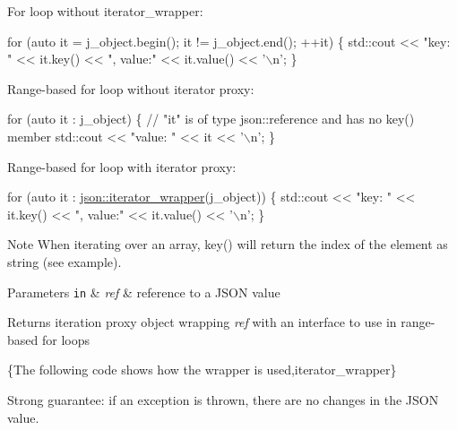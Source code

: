 For loop without iterator\+\_\+wrapper\+:


\begin{DoxyCode}
\textcolor{keywordflow}{for} (\textcolor{keyword}{auto} it = j\_object.begin(); it != j\_object.end(); ++it)
\{
    std::cout << \textcolor{stringliteral}{"key: "} << it.key() << \textcolor{stringliteral}{", value:"} << it.value() << \textcolor{charliteral}{'\(\backslash\)n'};
\}
\end{DoxyCode}


Range-\/based for loop without iterator proxy\+:


\begin{DoxyCode}
\textcolor{keywordflow}{for} (\textcolor{keyword}{auto} it : j\_object)
\{
    \textcolor{comment}{// "it" is of type json::reference and has no key() member}
    std::cout << \textcolor{stringliteral}{"value: "} << it << \textcolor{charliteral}{'\(\backslash\)n'};
\}
\end{DoxyCode}


Range-\/based for loop with iterator proxy\+:


\begin{DoxyCode}
\textcolor{keywordflow}{for} (\textcolor{keyword}{auto} it : \hyperlink{classnlohmann_1_1basic__json_a5e4212986136ca1220f351c60e89906b}{json::iterator\_wrapper}(j\_object))
\{
    std::cout << \textcolor{stringliteral}{"key: "} << it.key() << \textcolor{stringliteral}{", value:"} << it.value() << \textcolor{charliteral}{'\(\backslash\)n'};
\}
\end{DoxyCode}


\begin{DoxyNote}{Note}
When iterating over an array, {\ttfamily key()} will return the index of the element as string (see example).
\end{DoxyNote}

\begin{DoxyParams}[1]{Parameters}
\mbox{\tt in}  & {\em ref} & reference to a J\+S\+ON value \\
\hline
\end{DoxyParams}
\begin{DoxyReturn}{Returns}
iteration proxy object wrapping {\itshape ref} with an interface to use in range-\/based for loops
\end{DoxyReturn}
\{The following code shows how the wrapper is used,iterator\+\_\+wrapper\}

Strong guarantee\+: if an exception is thrown, there are no changes in the J\+S\+ON value.


